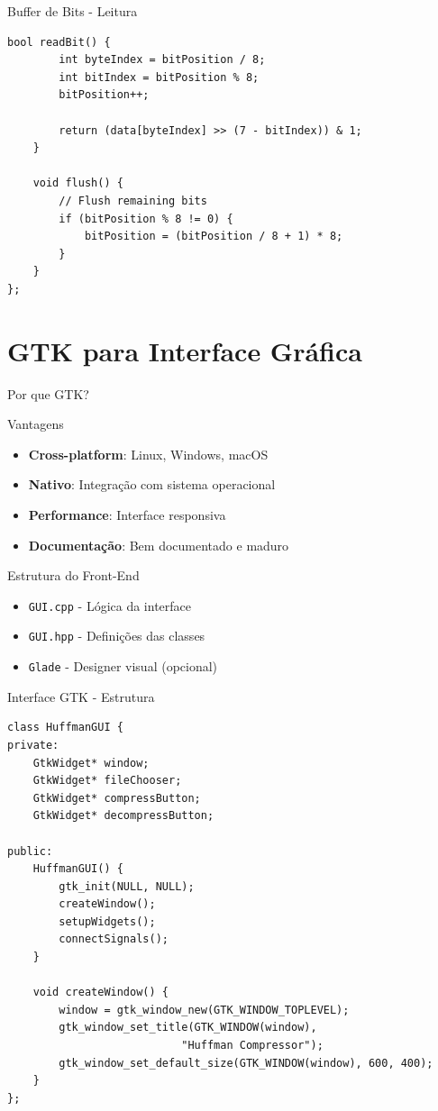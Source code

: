 \documentclass{beamer}
\begin{document}
\begin{frame}[fragile]{Buffer de Bits - Leitura}
    \begin{lstlisting}[style=CStyle, caption=Métodos de leitura de bits]
    bool readBit() {
        int byteIndex = bitPosition / 8;
        int bitIndex = bitPosition % 8;
        bitPosition++;
        
        return (data[byteIndex] >> (7 - bitIndex)) & 1;
    }
    
    void flush() {
        // Flush remaining bits
        if (bitPosition % 8 != 0) {
            bitPosition = (bitPosition / 8 + 1) * 8;
        }
    }
};
    \end{lstlisting}
\end{frame}

\section{GTK para Interface Gráfica}
\begin{frame}{Por que GTK?}
    \begin{block}{Vantagens}
        \begin{itemize}
            \item \textbf{Cross-platform}: Linux, Windows, macOS
            \item \textbf{Nativo}: Integração com sistema operacional
            \item \textbf{Performance}: Interface responsiva
            \item \textbf{Documentação}: Bem documentado e maduro
        \end{itemize}
    \end{block}
    \begin{block}{Estrutura do Front-End}
        \begin{itemize}
            \item \texttt{GUI.cpp} - Lógica da interface
            \item \texttt{GUI.hpp} - Definições das classes
            \item \texttt{Glade} - Designer visual (opcional)
        \end{itemize}
    \end{block}
\end{frame}

\begin{frame}[fragile]{Interface GTK - Estrutura}
    \begin{lstlisting}[style=CStyle, caption=Classe principal da GUI]
class HuffmanGUI {
private:
    GtkWidget* window;
    GtkWidget* fileChooser;
    GtkWidget* compressButton;
    GtkWidget* decompressButton;
    
public:
    HuffmanGUI() {
        gtk_init(NULL, NULL);
        createWindow();
        setupWidgets();
        connectSignals();
    }
    
    void createWindow() {
        window = gtk_window_new(GTK_WINDOW_TOPLEVEL);
        gtk_window_set_title(GTK_WINDOW(window), 
                           "Huffman Compressor");
        gtk_window_set_default_size(GTK_WINDOW(window), 600, 400);
    }
};
    \end{lstlisting}
\end{frame}
\end{document}
